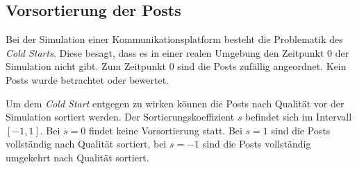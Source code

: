 \subsection{Vorsortierung der Posts}

Bei der Simulation einer Kommunikationsplatform besteht die Problematik des \textit{Cold Starts}. Diese besagt, dass es in einer realen Umgebung den Zeitpunkt $0$ der Simulation nicht gibt. Zum Zeitpunkt $0$ sind die Posts zufällig angeordnet. Kein Posts wurde betrachtet oder bewertet.

Um dem \textit{Cold Start} entgegen zu wirken können die Posts nach Qualität vor der Simulation sortiert werden.
Der Sortierungskoeffizient $s$ befindet sich im Intervall $[-1,1]$. Bei $s=0$ findet keine Vorsortierung statt. Bei $s=1$ sind die Posts vollständig nach Qualität sortiert, bei $s=-1$ sind die Posts vollständig umgekehrt nach Qualität sortiert.

